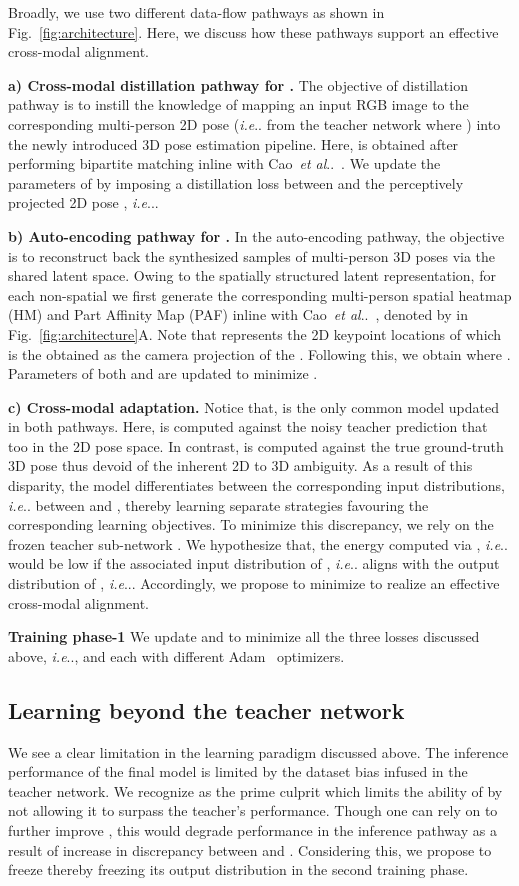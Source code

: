 \documentclass[runningheads]{llncs}
\makeatletter
\DeclareRobustCommand\onedot{\futurelet\@let@token\@onedot}
\def\@onedot{\ifx\@let@token.\else.\null\fi\xspace}
\def\ie{\emph{i.e}\onedot} \def\Ie{\emph{I.e}\onedot}
\def\etal{\emph{et al}\onedot}
\makeatother
\begin{document}
Broadly, we use two different data-flow pathways as shown in Fig.~\ref{fig:architecture}. Here, we discuss how these pathways support an effective cross-modal alignment.

\textbf{a) Cross-modal distillation pathway for .} The objective of distillation pathway is to instill the knowledge of mapping an input RGB image to the corresponding multi-person 2D pose (\ie from the teacher network  where ) into the newly introduced 3D pose estimation pipeline. Here,  is obtained after performing bipartite matching inline with Cao~\etal~\cite{cao2017realtime}. We update the parameters of  by imposing a distillation loss between  and the perceptively projected 2D pose , \ie .


\textbf{b) Auto-encoding pathway for .} In the auto-encoding pathway, the objective is to reconstruct back the synthesized samples of multi-person 3D poses via the shared latent space. Owing to the spatially structured latent representation, for each non-spatial  we first generate the corresponding multi-person spatial heatmap (HM) and Part Affinity Map (PAF) inline with Cao~\etal~\cite{cao2017realtime}, denoted by  in Fig.~\ref{fig:architecture}{\color{red}A}. Note that  represents the 2D keypoint locations of  which is the obtained as the camera projection of the . Following this, we obtain  where . Parameters of both  and  are updated to minimize .

\textbf{c) Cross-modal adaptation.} 
Notice that,  is the only common model updated in both pathways. Here,  is computed against the noisy teacher prediction that too in the 2D pose space. In contrast,  is computed against the true ground-truth 3D pose thus devoid of the inherent 2D to 3D ambiguity. As a result of this disparity, the model  differentiates between the corresponding input distributions, \ie between  and , thereby learning separate strategies favouring the corresponding learning objectives. To minimize this discrepancy, we rely on the frozen teacher sub-network . We hypothesize that, the energy computed via , \ie  would be low if the associated input distribution of , \ie  aligns with the output distribution of , \ie . Accordingly, we propose to minimize  to realize an effective cross-modal alignment.

\noindent
\textbf{Training phase-1} We update  and  to minimize all the three losses discussed above, \ie ,  and  each with different Adam~\cite{kingma2014adam} optimizers.




\subsection{Learning beyond the teacher network}
We see a clear limitation in the learning paradigm discussed above. The inference performance of the final model is limited by the dataset bias infused in the teacher network. We recognize  as the prime culprit which limits the ability of  by not allowing it to surpass the teacher's performance. Though one can rely on  to further improve , this would degrade performance in the inference pathway as a result of increase in discrepancy between  and . Considering this, we propose to freeze  thereby freezing its output distribution  in the second training phase. 
\end{document}
